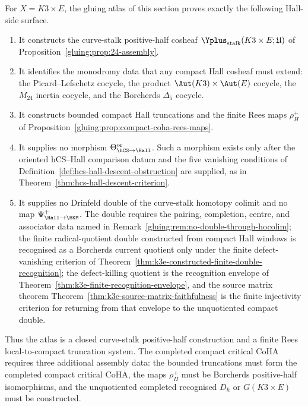 \begin{proposition}
\label{gluing:prop:k3xe-ran-atlas-proved-surface}
For $X=K3\times E$, the gluing atlas of this section proves exactly the
following Hall-side surface.
\begin{enumerate}[label=\textup{(\roman*)}]
\item It constructs the curve-stalk positive-half cosheaf
\(\Yplus_{\mathrm{stalk}}(K3\times E;\mathfrak U)\) of
Proposition~\ref{gluing:prop:24-assembly}.
\item It identifies the monodromy data that any compact Hall cosheaf
must extend: the Picard--Lefschetz cocycle, the product
$\Aut(K3)\times\Aut(E)$ cocycle, the $M_{24}$ inertia cocycle, and the
Borcherds $\Delta_5$ cocycle.
\item It constructs bounded compact Hall truncations and the finite
Rees maps
\(\rho_H^+\) of
Proposition~\ref{gluing:prop:compact-coha-rees-maps}.
\item It supplies no morphism
\(\Theta_{\hCS\to\Hall}^{\mathrm{or}}\). Such a morphism exists only
after the oriented hCS--Hall comparison datum and the five vanishing
conditions of Definition~\ref{def:hcs-hall-descent-obstruction} are
supplied, as in Theorem~\ref{thm:hcs-hall-descent-criterion}.
\item It supplies no Drinfeld double of the curve-stalk homotopy
colimit and no map
\(\Psi^+_{\Hall\to\BKM}\). The double requires the pairing,
completion, centre, and associator data named in
Remark~\ref{gluing:rem:no-double-through-hocolim}; the finite
radical-quotient double constructed from compact Hall windows is
recognised as a Borcherds current quotient only under the finite
defect-vanishing criterion of
Theorem~\ref{thm:k3e-constructed-finite-double-recognition}; the
defect-killing quotient is the recognition envelope of
Theorem~\ref{thm:k3e-finite-recognition-envelope}, and the source
matrix theorem
Theorem~\ref{thm:k3e-source-matrix-faithfulness} is the finite
injectivity criterion for returning from that envelope to the unquotiented
compact double.
\end{enumerate}
Thus the atlas is a closed curve-stalk positive-half construction and
a finite Rees local-to-compact truncation system. The completed compact
critical CoHA requires three additional assembly data: the bounded
truncations must form the completed compact critical CoHA, the maps
\(\rho_H^+\) must be Borcherds positive-half isomorphisms, and the
unquotiented completed recognised \(D_\hbar\) or \(G(K3\times E)\)
must be constructed.
\end{proposition}


